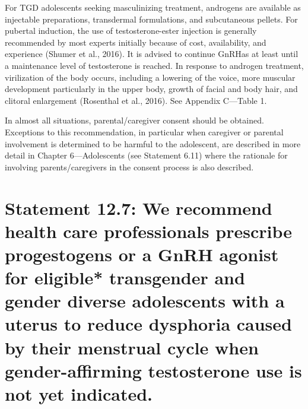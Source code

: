 \documentclass[
]{book}
\begin{document}
For TGD adolescents seeking masculinizing
treatment, androgens are available as injectable
preparations, transdermal formulations, and subcutaneous pellets. For pubertal induction, the use
of testosterone-ester injection is generally recommended by most experts initially because of cost,
availability, and experience (Shumer et al., 2016).
It is advised to continue GnRHas at least until
a maintenance level of testosterone is reached. In
response to androgen treatment, virilization of
the body occurs, including a lowering of the
voice, more muscular development particularly
in the upper body, growth of facial and body
hair, and clitoral enlargement (Rosenthal et al.,
2016). See Appendix C---Table 1.

In almost all situations, parental/caregiver consent should be obtained. Exceptions to this recommendation, in particular when caregiver or
parental involvement is determined to be harmful
to the adolescent, are described in more detail
in Chapter 6---Adolescents (see Statement 6.11)
where the rationale for involving parents/caregivers in the consent process is also described.

\hypertarget{statement-12.7-we-recommend-health-care-professionals-prescribe-progestogens-or-a-gnrh-agonist-for-eligible-transgender-and-gender-diverse-adolescents-with-a-uterus-to-reduce-dysphoria-caused-by-their-menstrual-cycle-when-gender-affirming-testosterone-use-is-not-yet-indicated.}{%
\section*{Statement 12.7: We recommend health care professionals prescribe progestogens or a GnRH agonist for eligible* transgender and gender diverse adolescents with a uterus to reduce dysphoria caused by their menstrual cycle when gender-affirming testosterone use is not yet indicated.}\label{statement-12.7-we-recommend-health-care-professionals-prescribe-progestogens-or-a-gnrh-agonist-for-eligible-transgender-and-gender-diverse-adolescents-with-a-uterus-to-reduce-dysphoria-caused-by-their-menstrual-cycle-when-gender-affirming-testosterone-use-is-not-yet-indicated.}}
\end{document}
